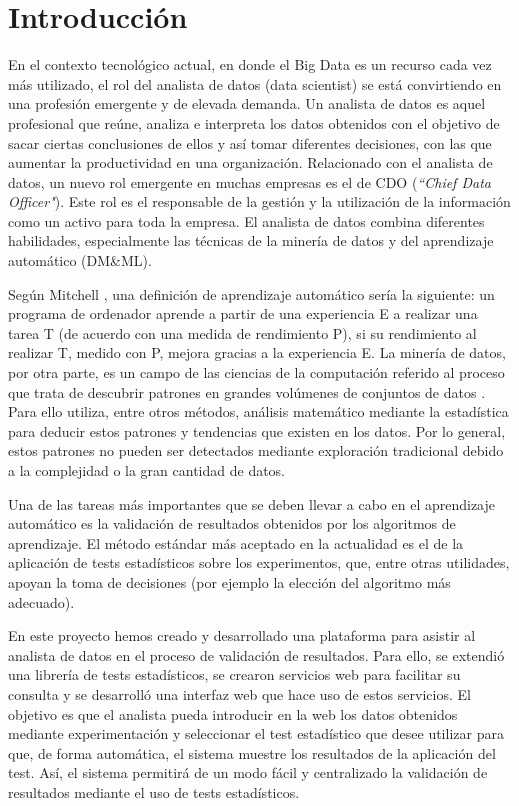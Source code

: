 
\chapter{Introducción}
En el contexto tecnológico actual, en donde el Big Data es un recurso cada vez más utilizado, el rol
del analista de datos (data scientist) se está convirtiendo en una profesión emergente y de elevada
demanda. Un analista de datos es aquel profesional que reúne, analiza e interpreta los datos obtenidos
con el objetivo de sacar ciertas conclusiones de ellos y así tomar diferentes decisiones, con las que
aumentar la productividad en una organización. Relacionado con el analista de datos, un nuevo rol emergente
en muchas empresas es el de CDO (\textit{``Chief Data Officer"}). Este rol es el responsable de la gestión
y la utilización de la información como un activo para toda la empresa. El analista de datos combina diferentes
habilidades, especialmente las técnicas de la minería de datos y del aprendizaje automático (DM\&ML).

Según Mitchell \cite{mitchell}, una definición de aprendizaje automático sería la siguiente: un programa
de ordenador aprende a partir de una experiencia E a realizar una tarea T (de acuerdo con una medida de
rendimiento P), si su rendimiento al realizar T, medido con P, mejora gracias a la experiencia E. La
minería de datos, por otra parte, es un campo de las ciencias de la computación referido al proceso que trata
de descubrir patrones en grandes volúmenes de conjuntos de datos \cite{mineria}. Para ello utiliza, entre
otros métodos, análisis matemático mediante la estadística para deducir estos patrones y tendencias que
existen en los datos. Por lo general, estos patrones no pueden ser detectados mediante exploración tradicional
debido a la complejidad o la gran cantidad de datos.

Una de las tareas más importantes que se deben llevar a cabo en el aprendizaje automático es la
validación de resultados obtenidos por los algoritmos de aprendizaje. El método estándar más aceptado
en la actualidad es el de la aplicación de tests estadísticos sobre los experimentos, que, entre otras
utilidades, apoyan la toma de decisiones (por ejemplo la elección del algoritmo más adecuado).

En este proyecto hemos creado y desarrollado una plataforma para asistir al analista de
datos en el proceso de validación de resultados. Para ello, se extendió una librería de tests
estadísticos, se crearon servicios web para facilitar su consulta y se desarrolló una interfaz web
que hace uso de estos servicios. El objetivo es que el analista pueda introducir en la web los datos obtenidos
mediante experimentación y seleccionar el test estadístico que desee utilizar para que, de forma automática, el
sistema muestre los resultados de la aplicación del test. Así, el sistema permitirá de un modo fácil y
centralizado la validación de resultados mediante el uso de tests estadísticos.

